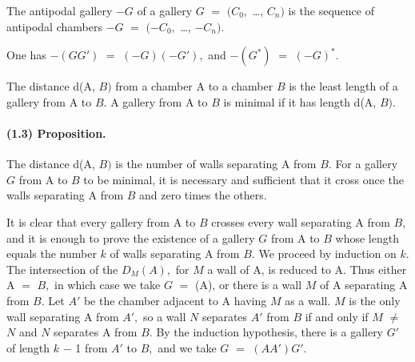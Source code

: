 \documentclass[10pt,a4paper]{article}
\begin{document}
The antipodal gallery \ensuremath{-G} of a gallery \ensuremath{G} \ensuremath{=} \ensuremath{(C_0,} \ldots{}, \ensuremath{C_n)} is the sequence of antipodal chambers \ensuremath{-G} \ensuremath{=} \ensuremath{(-C_0,} \ldots{}, \ensuremath{-C_n).}\par

One has \ensuremath{-(GG')} \ensuremath{=} \ensuremath{(-G)(-G'),} and \ensuremath{-(G^{*})} \ensuremath{=} \ensuremath{(-G)^{*}.}\par

The distance d(A, \ensuremath{B)} from a chamber A to a chamber \ensuremath{B} is the least length of a gallery from A to \ensuremath{B.} A gallery from A to \ensuremath{B} is minimal if it has length d(A, \ensuremath{B).}\par

\paragraph{(1.3) Proposition.} The distance d(A, \ensuremath{B)} is the number of walls separating A from \ensuremath{B.} For a gallery \ensuremath{G} from A to \ensuremath{B} to be minimal, it is necessary and sufficient that it cross once the walls separating A from \ensuremath{B} and zero times the others.

It is clear that every gallery from A to \ensuremath{B} crosses every wall separating A from \ensuremath{B,} and it is enough to prove the existence of a gallery \ensuremath{G} from A to \ensuremath{B} whose length equals the number \ensuremath{k} of walls separating A from \ensuremath{B.} We proceed by induction on \ensuremath{k.} The intersection of the \ensuremath{D_M(A),} for \ensuremath{M} a wall of A, is reduced to A. Thus either A \ensuremath{=} \ensuremath{B,} in which case we take \ensuremath{G} \ensuremath{=} (A), or there is a wall \ensuremath{M} of A separating A from \ensuremath{B.} Let \ensuremath{A'} be the chamber adjacent to A having \ensuremath{M} as a wall. \ensuremath{M} is the only wall separating A from \ensuremath{A',} so a wall \ensuremath{N} separates \ensuremath{A'} from \ensuremath{B} if and only if \ensuremath{M} \ensuremath{\ne{}} \ensuremath{N} and \ensuremath{N} separates A from \ensuremath{B.} By the induction hypothesis, there is a gallery \ensuremath{G'} of length \ensuremath{k} \ensuremath{-} 1 from \ensuremath{A'} to \ensuremath{B,} and we take \ensuremath{G} \ensuremath{=} \ensuremath{(AA')G'.}\par
\end{document}
